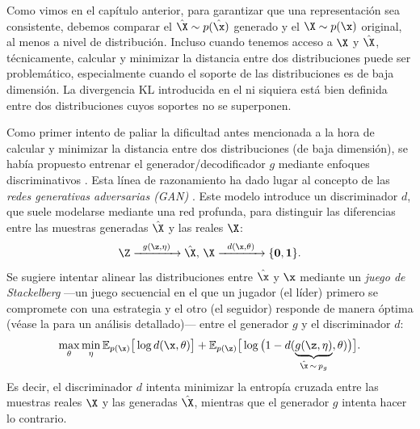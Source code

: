 \documentclass[../../book-main_es.tex]{subfiles}
\begin{document}
Como vimos en el capítulo anterior, para garantizar que una
representación sea consistente, debemos comparar el $\hat
\X \sim p(\hat\x)$ generado y el $\X \sim p(\x)$ original, al menos a
nivel de distribución. Incluso cuando tenemos acceso a $\X$ y $\hat \X$,
técnicamente, calcular y minimizar la distancia entre dos
distribuciones puede ser problemático, especialmente cuando el soporte de las
distribuciones es de baja dimensión. La divergencia KL introducida en el
 ni siquiera está bien definida entre dos
distribuciones cuyos soportes no se superponen.

Como primer intento de paliar la dificultad antes mencionada a la hora de calcular
y minimizar la distancia entre dos distribuciones (de baja dimensión),
se había propuesto entrenar el generador/decodificador
$g$ mediante enfoques discriminativos \cite{Tu-2007}.  Esta línea de
razonamiento ha dado lugar al concepto de las {\em redes generativas adversarias
(GAN)} \cite{goodfellow2014generative}. Este modelo introduce un discriminador
$d$, que suele modelarse mediante una red profunda, para distinguir las diferencias
entre las muestras generadas $\hat \X$ y las reales $\X$:
\begin{equation}
    \Z \xrightarrow{\hspace{2mm} g(\z,\eta) \hspace{2mm}} \hat \X, \,
    \X \xrightarrow{\hspace{2mm} d(\x, \theta)\hspace{2mm}} \{\mathbf
    0, \mathbf 1\}.
    \label{eqn:GAN}
\end{equation}
Se sugiere intentar alinear las distribuciones
entre $\hat \x$ y $\x$ mediante un {\em juego de Stackelberg} ---un
juego secuencial en el que un jugador (el líder) primero se compromete con una
estrategia y el otro (el seguidor) responde de manera óptima (véase la
 para un análisis detallado)--- entre el generador
$g$ y el discriminador $d$:
\begin{equation}
    \max_{\theta}\min_{\eta} \mathbb{E}_{p({\x})}\big[\log
    d(\x,\theta)\big] + \mathbb{E}_{p({\z})}\big[\log\big(1 -
    d(\underbrace{g(\z,\eta)}_{\hat \x \,\sim\, p_g},\theta)\big)\big].
\end{equation}
Es decir, el discriminador $d$ intenta minimizar la entropía cruzada
entre las muestras reales $\X$ y las generadas $\hat
\X$, mientras que el generador $g$ intenta hacer lo contrario.
\end{document}
